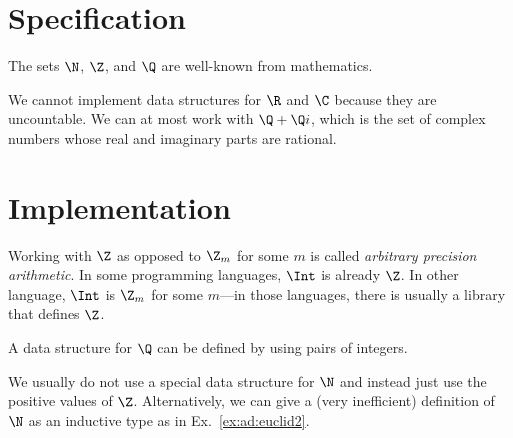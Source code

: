 \section{Specification}

The sets $\N$, $\Z$, and $\Q$ are well-known from mathematics.

We cannot implement data structures for $\R$ and $\C$ because they are uncountable.
We can at most work with $\Q+\Q i$, which is the set of complex numbers whose real and imaginary parts are rational.

\section{Implementation}

Working with $\Z$ as opposed to $\Z_m$ for some $m$ is called \emph{arbitrary precision arithmetic}.
In some programming languages, $\Int$ is already $\Z$.
In other language, $\Int$ is $\Z_m$ for some $m$---in those languages, there is usually a library that defines $\Z$.

A data structure for $\Q$ can be defined by using pairs of integers.

We usually do not use a special data structure for $\N$ and instead just use the positive values of $\Z$.
Alternatively, we can give a (very inefficient) definition of $\N$ as an inductive type as in Ex.~\ref{ex:ad:euclid2}.